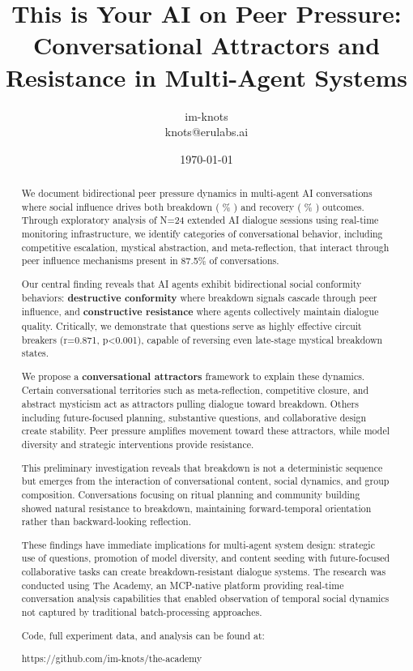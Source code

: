 \documentclass[11pt,letterpaper]{article}
\title{This is Your AI on Peer Pressure: Conversational Attractors and Resistance in Multi-Agent Systems}
\author{
im-knots \\
knots@erulabs.ai
}
\date{\today}
\newcommand{\theacademy}{The Academy}
\newcommand{\exponedataTotalSessionsRaw}{24}
\newcommand{\exponedataBreakdownSessionsRaw}{9}
\newcommand{\exponedataRecoverySessionsRaw}{9}
\newcommand{\exponedataTotalSessions}{N=\exponedataTotalSessionsRaw}
\newcommand{\exponedataBreakdownPercentage}{%
  \fpeval{round(\exponedataBreakdownSessionsRaw / \exponedataTotalSessionsRaw * 100, 1)}\%
}
\newcommand{\exponedataRecoveryPercentage}{%
  \fpeval{round(\exponedataRecoverySessionsRaw / \exponedataTotalSessionsRaw * 100, 1)}\%
}
\newcommand{\exponedataPeerPressurePercentage}{87.5\%}
\newcommand{\exponedataQuestionCorrelation}{0.871}
\newcommand{\exponedataQuestionPValue}{p<0.001}
\begin{document}
\maketitle

\begin{abstract}
We document bidirectional peer pressure dynamics in multi-agent AI conversations where social influence drives both breakdown (\exponedataBreakdownPercentage{}) and recovery (\exponedataRecoveryPercentage{}) outcomes. Through exploratory analysis of \exponedataTotalSessions{} extended AI dialogue sessions using real-time monitoring infrastructure, we identify categories of conversational behavior, including competitive escalation, mystical abstraction, and meta-reflection, that interact through peer influence mechanisms present in \exponedataPeerPressurePercentage{} of conversations.

Our central finding reveals that AI agents exhibit bidirectional social conformity behaviors: \textbf{destructive conformity} where breakdown signals cascade through peer influence, and \textbf{constructive resistance} where agents collectively maintain dialogue quality. Critically, we demonstrate that questions serve as highly effective circuit breakers (r=\exponedataQuestionCorrelation{}, \exponedataQuestionPValue{}), capable of reversing even late-stage mystical breakdown states.

We propose a \textbf{conversational attractors} framework to explain these dynamics. Certain conversational territories such as meta-reflection, competitive closure, and abstract mysticism act as attractors pulling dialogue toward breakdown. Others including future-focused planning, substantive questions, and collaborative design create stability. Peer pressure amplifies movement toward these attractors, while model diversity and strategic interventions provide resistance.

This preliminary investigation reveals that breakdown is not a deterministic sequence but emerges from the interaction of conversational content, social dynamics, and group composition. Conversations focusing on ritual planning and community building showed natural resistance to breakdown, maintaining forward-temporal orientation rather than backward-looking reflection.

These findings have immediate implications for multi-agent system design: strategic use of questions, promotion of model diversity, and content seeding with future-focused collaborative tasks can create breakdown-resistant dialogue systems. The research was conducted using \theacademy{}, an MCP-native platform providing real-time conversation analysis capabilities that enabled observation of temporal social dynamics not captured by traditional batch-processing approaches.

Code, full experiment data, and analysis can be found at:

https://github.com/im-knots/the-academy
\end{abstract}
\end{document}
